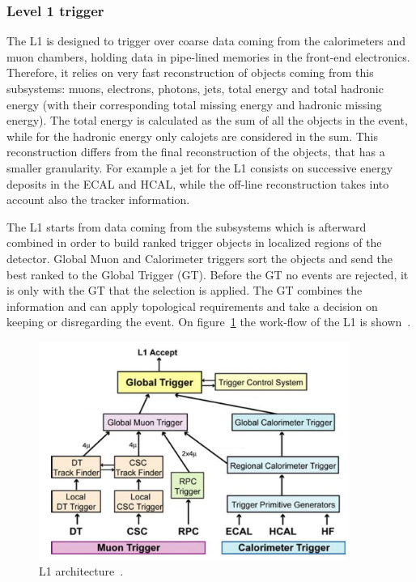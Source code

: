 \subsubsection{Level 1 trigger}
\label{sec:L1}

The L1 is designed to trigger over coarse data coming from the calorimeters and muon chambers, holding data in pipe-lined memories in the front-end electronics. Therefore, it relies on very fast reconstruction of objects coming from this subsystems: muons, electrons, photons, jets, total energy and total hadronic energy (with their corresponding total missing energy and hadronic missing energy). The total energy is calculated as the sum of all the objects in the event, while for the hadronic energy only calojets are considered in the sum. This reconstruction differs from the final reconstruction of the objects, that has a smaller granularity. For example a jet for the L1 consists on successive energy deposits in the ECAL and HCAL, while the off-line reconstruction takes into account also the tracker information. 

The L1 starts from data coming from the subsystems which is afterward combined in order to build ranked trigger objects in localized regions of the detector. Global Muon and Calorimeter triggers sort the objects and send the best ranked to the Global Trigger (GT). Before the GT no events are rejected, it is only with the GT that the selection is applied. The GT combines the information and can apply topological requirements and take a decision on keeping or disregarding the event. On figure~\ref{fig:l1} the work-flow of the L1 is shown~\cite{Lenzi:2013xpa}. 

\begin{figure}[!Hhtbp]
  \begin{center}
    \includegraphics[width=0.9\textwidth]{figs/img_l1.png}
    \caption{L1 architecture~\cite{Lenzi:2013xpa}.}
    \label{fig:l1}
  \end{center}
\end{figure}

